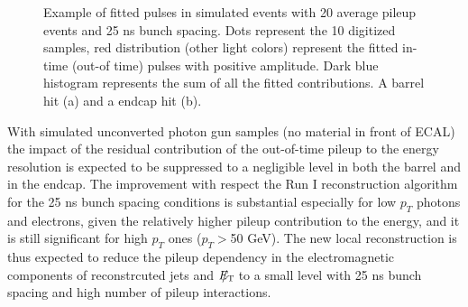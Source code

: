 \documentclass[journal]{IEEEtran}
\newcommand{\ETslash}{\ensuremath{E_{\mathrm{T}}\hspace{-1.1em}/\kern0.45em}}
\begin{document}
\begin{figure}[!t]
  \begin{center}
    \caption{Example of fitted pulses in simulated events with 20 average pileup events and 25 ns bunch spacing. Dots represent the 10 digitized samples, red distribution (other light colors) represent the fitted in-time (out-of time) pulses with positive amplitude. Dark blue histogram represents the sum of all the fitted contributions. A barrel hit (a) and a endcap hit (b).  \label{fig:multifits} }
  \end{center}
\end{figure}
%
With simulated unconverted photon gun samples (no material in front of ECAL) the impact of the residual contribution of the out-of-time pileup to the energy resolution is expected to be suppressed to a negligible level in both the barrel and in the endcap. The improvement with respect the Run I reconstruction algorithm for the 25 ns bunch spacing conditions is substantial especially for low $p_T$ photons and electrons, given the relatively higher pileup contribution to the energy, and it is still significant for high $p_T$ ones ($p_T>$50 GeV). The new local reconstruction is thus expected to reduce the pileup dependency in the electromagnetic components of reconstrcuted jets and $\ETslash$ to a small level with 25 ns bunch spacing and high number of pileup interactions.
\end{document}
